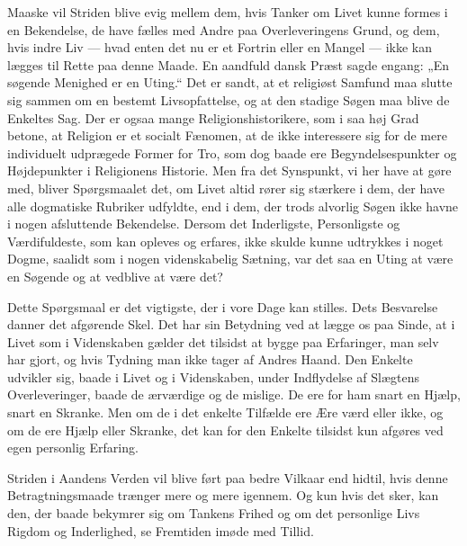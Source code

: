 \documentclass[12pt,a4paper]{article}
\newcommand{\opage}[1]{\marginnote{\footnotesize\textit{[#1]}}}
\begin{document}
Maaske vil Striden blive evig mellem dem, hvis Tanker om Livet kunne formes i en
Bekendelse, de have fælles med Andre paa Overleveringens Grund, og dem, hvis
indre Liv --- hvad enten det nu er et Fortrin eller en Mangel --- ikke kan
lægges til Rette paa denne Maade. En aandfuld dansk Præst sagde engang: „En
søgende Menighed er en Uting.“ Det er sandt, at et religiøst Samfund maa slutte
sig sammen om en bestemt Livsopfattelse, og at den stadige Søgen maa blive de
Enkeltes Sag. Der er ogsaa mange Religionshistorikere, som i saa høj Grad betone,
at Religion er et socialt Fænomen, at de ikke interessere sig for de mere
individuelt udprægede Former for Tro, som dog baade ere \opage{59} Begyndelsespunkter og
Højdepunkter i Religionens Historie. Men fra det Synspunkt, vi her have at gøre
med, bliver Spørgsmaalet det, om Livet altid rører sig stærkere i dem, der have
alle dogmatiske Rubriker udfyldte, end i dem, der trods alvorlig Søgen ikke havne
i nogen afsluttende Bekendelse. Dersom det Inderligste, Personligste og
Værdifuldeste, som kan opleves og erfares, ikke skulde kunne udtrykkes i noget
Dogme, saalidt som i nogen videnskabelig Sætning, var det saa en Uting at være en
Søgende og at vedblive at være det?

Dette Spørgsmaal er det vigtigste, der i vore Dage kan stilles. Dets Besvarelse
danner det afgørende Skel. Det har sin Betydning ved at lægge os paa Sinde, at i
Livet som i Videnskaben gælder det tilsidst at bygge paa Erfaringer, man selv
har gjort, og hvis Tydning man ikke tager af Andres Haand. Den Enkelte udvikler
sig, baade i Livet og i Videnskaben, under Indflydelse af Slægtens
Overleveringer, baade de ærværdige og de mislige. De ere for ham snart en Hjælp,
snart en Skranke. Men om de i det enkelte Tilfælde ere Ære værd eller ikke, og
om de ere Hjælp eller Skranke, det kan for den Enkelte tilsidst kun afgøres ved
egen personlig Erfaring.

Striden i Aandens Verden vil blive ført paa bedre Vilkaar end hidtil, hvis denne
Betragtningsmaade trænger mere og mere igennem. Og kun hvis det sker, kan den,
der baade bekymrer sig om Tankens Frihed og om det personlige Livs Rigdom og
Inderlighed, se Fremtiden imøde med Tillid.
\end{document}
